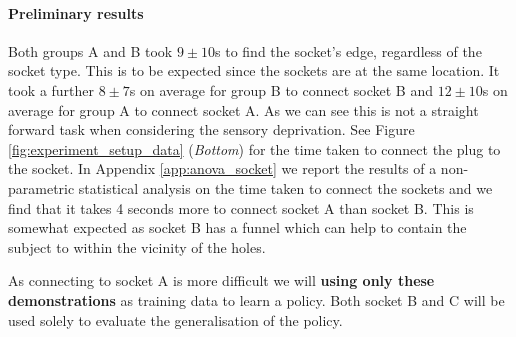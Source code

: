 

\paragraph{Preliminary results}

Both groups A and B took $9\pm10$s to find the socket's edge, regardless of the socket type. This is to be expected since the sockets 
are at the same location. It took a further $8\pm7$s on average for group B to connect
socket B and $12\pm10$s on average for group A to connect socket A. As we can see this is not a straight forward task when considering
the sensory deprivation. See Figure \ref{fig:experiment_setup_data} (\textit{Bottom}) for the time taken to connect the plug to the socket.
In Appendix \ref{app:anova_socket} we report the results of a non-parametric statistical analysis on the time taken to connect
the sockets and we find that it takes 4 seconds more to connect socket A than socket B. This is somewhat expected as 
socket B has a funnel which can help to contain the subject to within the vicinity of the holes.

As connecting to socket A is more difficult we will \textbf{using only these demonstrations} as training data to learn a policy. Both
socket B and C will be used solely to evaluate the generalisation of the policy.

